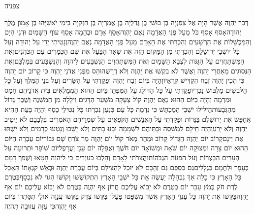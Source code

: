 \documentclass[../main/main.tex]{subfiles}
\begin{document}
\Incipit{}צפניה\par
\vspace{\afterchapskip}
\RTLmulticolcolumns
\begin{multicols}{\ncols}
דְּבַר יַהְוֶה אֲשֶׁר הָיָה אֶל צְפַנְיָה בֶּן כּוּשִׁי בֶן גְּדַלְיָה בֶּן אֲמַרְיָה בֶּן חִזְקִיָּה בִּימֵי יֹאשִׁיָּהוּ בֶן אָמוֹן מֶלֶךְ יְהוּדָה\PreVerseSpace{}אָסֹף אָסֵף כֹּל מֵעַל פְּנֵי הָאֲדָמָה נְאֻם יַהְוֶה\PreVerseSpace{}אָסֵף אָדָם וּבְהֵמָה אָסֵף עוֹף הַשָּׁמַיִם וּדְגֵי הַיָּם וְהַמַּכְשֵׁלוֹת אֶת הָרְשָׁעִים וְהִכְרַתִּי אֶת הָאָדָם מֵעַל פְּנֵי הָאֲדָמָה נְאֻם יַהְוֶה\PreVerseSpace{}וְנָטִיתִי יָדִי עַל יְהוּדָה וְעַל כָּל יוֹשְׁבֵי יְרוּשָׁלֵם וְהִכְרַתִּי מִן הַמָּקוֹם הַזֶּה אֶת שְׁאָר הַבַּעַל אֶת שֵׁם הַכְּמָרִים עִם הַכֹּהֲנִים\PreVerseSpace{}וְאֶת הַמִּשְׁתַּחֲוִים עַל הַגַּגּוֹת לִצְבָא הַשָּׁמָיִם וְאֶת הַמִּשְׁתַּחֲוִים הַנִּשְׁבָּעִים לַיהוָה וְהַנִּשְׁבָּעִים בְּמַלְכָּם\PreVerseSpace{}וְאֶת הַנְּסוֹגִים מֵאַחֲרֵי יַהְוֶה וַאֲשֶׁר לֹא בִקְשׁוּ אֶת יַהְוֶה וְלֹא דְרָשֻׁהוּ\PreVerseSpace{}הַס מִפְּנֵי אֲדֹנַי יַהְוֶה כִּי קָרוֹב יוֹם יַהְוֶה כִּי הֵכִין יַהְוֶה זֶבַח הִקְדִּישׁ קְרֻאָיו\PreVerseSpace{}וְהָיָה בְּיוֹם זֶבַח יַהְוֶה וּפָקַדְתִּי עַל הַשָּׂרִים וְעַל בְּנֵי הַמֶּלֶךְ וְעַל כָּל הַלֹּבְשִׁים מַלְבּוּשׁ נָכְרִי\PreVerseSpace{}וּפָקַדְתִּי עַל כָּל הַדּוֹלֵג עַל הַמִּפְתָּן בַּיּוֹם הַהוּא הַמְמַלְאִים בֵּית אֲדֹנֵיהֶם חָמָס וּמִרְמָה \ClosedSection{}וְהָיָה בַיּוֹם הַהוּא נְאֻם יַהְוֶה קוֹל צְעָקָה מִשַּׁעַר הַדָּגִים וִילָלָה מִן הַמִּשְׁנֶה וְשֶׁבֶר גָּדוֹל מֵהַגְּבָעוֹת\PreVerseSpace{}הֵילִילוּ יֹשְׁבֵי הַמַּכְתֵּשׁ כִּי נִדְמָה כָּל עַם כְּנַעַן נִכְרְתוּ כָּל נְטִילֵי כָסֶף \ClosedSection{}וְהָיָה בָּעֵת הַהִיא אֲחַפֵּשׂ אֶת יְרוּשָׁלֵם בַּנֵּרוֹת וּפָקַדְתִּי עַל הָאֲנָשִׁים הַקֹּפְאִים עַל שִׁמְרֵיהֶם הָאֹמְרִים בִּלְבָבָם לֹא יֵיטִיב יַהְוֶה וְלֹא יָרֵעַ\PreVerseSpace{}וְהָיָה חֵילָם לִמְשִׁסָּה וּבָתֵּיהֶם לִשְׁמָמָה וּבָנוּ בָתִּים וְלֹא יֵשֵׁבוּ וְנָטְעוּ כְרָמִים וְלֹא יִשְׁתּוּ אֶת יֵינָם\PreVerseSpace{}קָרוֹב יוֹם יַהְוֶה הַגָּדוֹל קָרוֹב וּמַהֵר מְאֹד קוֹל יוֹם יַהְוֶה מַר צֹרֵחַ שָׁם גִּבּוֹר\PreVerseSpace{}יוֹם עֶבְרָה הַיּוֹם הַהוּא יוֹם צָרָה וּמְצוּקָה יוֹם שֹׁאָה וּמְשׁוֹאָה יוֹם חֹשֶׁךְ וַאֲפֵלָה יוֹם עָנָן וַעֲרָפֶל\PreVerseSpace{}יוֹם שׁוֹפָר וּתְרוּעָה עַל הֶעָרִים הַבְּצֻרוֹת וְעַל הַפִּנּוֹת הַגְּבֹהוֹת\PreVerseSpace{}וַהֲצֵרֹתִי לָאָדָם וְהָלְכוּ כַּעִוְרִים כִּי לַיהוָה חָטָאוּ וְשֻׁפַּךְ דָּמָם כֶּעָפָר וּלְחֻמָם כַּגְּלָלִים\PreVerseSpace{}גַּם כַּסְפָּם גַּם זְהָבָם לֹא יוּכַל לְהַצִּילָם בְּיוֹם עֶבְרַת יַהְוֶה וּבְאֵשׁ קִנְאָתוֹ תֵּאָכֵל כָּל הָאָרֶץ כִּי כָלָה אַךְ נִבְהָלָה יַעֲשֶׂה אֵת כָּל יֹשְׁבֵי הָאָרֶץ \ClosedSection{}הִתְקוֹשְׁשׁוּ וָקוֹשּׁוּ הַגּוֹי לֹא נִכְסָף\PreVerseSpace{}בְּטֶרֶם לֶדֶת חֹק כְּמֹץ עָבַר יוֹם בְּטֶרֶם לֹא יָבוֹא עֲלֵיכֶם חֲרוֹן אַף יַהְוֶה בְּטֶרֶם לֹא יָבוֹא עֲלֵיכֶם יוֹם אַף יַהְוֶה\PreVerseSpace{}בַּקְּשׁוּ אֶת יַהְוֶה כָּל עַנְוֵי הָאָרֶץ אֲשֶׁר מִשְׁפָּטוֹ פָּעָלוּ בַּקְּשׁוּ צֶדֶק בַּקְּשׁוּ עֲנָוָה אוּלַי תִּסָּתְרוּ בְּיוֹם אַף יַהְוֶה\PreVerseSpace{}כִּי עַזָּה עֲזוּבָה תִהְיֶה 
\end{multicols}
\end{document}
